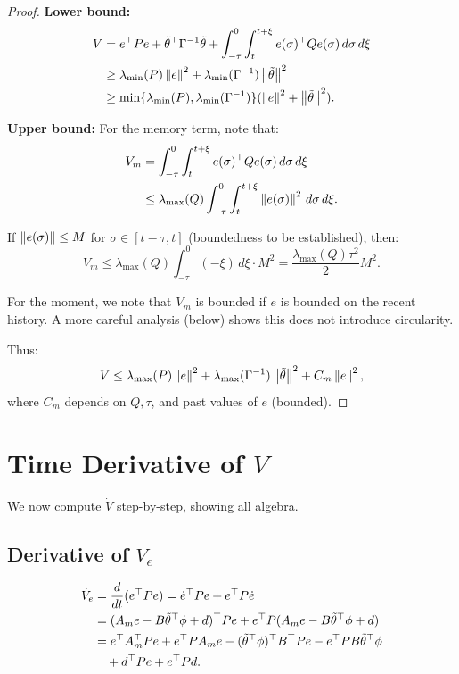 \begin{proof}
\textbf{Lower bound:}
\begin{align}
    V &= e^\top P e + \tilde{\theta}^\top \Gamma^{-1} \tilde{\theta} + \int_{-\tau}^0 \int_t^{t+\xi} e(\sigma)^\top Q e(\sigma) \, d\sigma \, d\xi \\
    &\geq \lambda_{\min}(P) \left\| e \right\|^2 + \lambda_{\min}(\Gamma^{-1}) \left\| \tilde{\theta} \right\|^2 \\
    &\geq \min\{\lambda_{\min}(P), \lambda_{\min}(\Gamma^{-1})\} (\left\| e \right\|^2 + \left\| \tilde{\theta} \right\|^2).
\end{align}

\textbf{Upper bound:}
For the memory term, note that:
\begin{align}
    V_m &= \int_{-\tau}^0 \int_t^{t+\xi} e(\sigma)^\top Q e(\sigma) \, d\sigma \, d\xi \\
    &\leq \lambda_{\max}(Q) \int_{-\tau}^0 \int_t^{t+\xi} \left\| e(\sigma) \right\|^2 \, d\sigma \, d\xi.
\end{align}

If $\left\| e(\sigma) \right\| \leq M$ for $\sigma \in [t-\tau, t]$ (boundedness to be established), then:
\begin{equation}
    V_m \leq \lambda_{\max}(Q) \int_{-\tau}^0 (-\xi) \, d\xi \cdot M^2 = \frac{\lambda_{\max}(Q) \tau^2}{2} M^2.
\end{equation}

For the moment, we note that $V_m$ is bounded if $e$ is bounded on the recent history. A more careful analysis (below) shows this does not introduce circularity.

Thus:
\begin{equation}
    V \leq \lambda_{\max}(P) \left\| e \right\|^2 + \lambda_{\max}(\Gamma^{-1}) \left\| \tilde{\theta} \right\|^2 + C_m \left\| e \right\|^2,
\end{equation}
where $C_m$ depends on $Q, \tau$, and past values of $e$ (bounded).
\end{proof}

\section{Time Derivative of $V$}

We now compute $\dot{V}$ step-by-step, showing all algebra.

\subsection{Derivative of $V_e$}

\begin{align}
    \dot{V}_e &= \frac{d }{d t}(e^\top P e) = \dot{e}^\top P e + e^\top P \dot{e} \\
    &= (A_m e - B \tilde{\theta}^\top \phi + d)^\top P e + e^\top P (A_m e - B \tilde{\theta}^\top \phi + d) \\
    &= e^\top A_m^\top P e + e^\top P A_m e - (\tilde{\theta}^\top \phi)^\top B^\top P e - e^\top P B \tilde{\theta}^\top \phi \nonumber \\
    &\quad + d^\top P e + e^\top P d.
\end{align}


